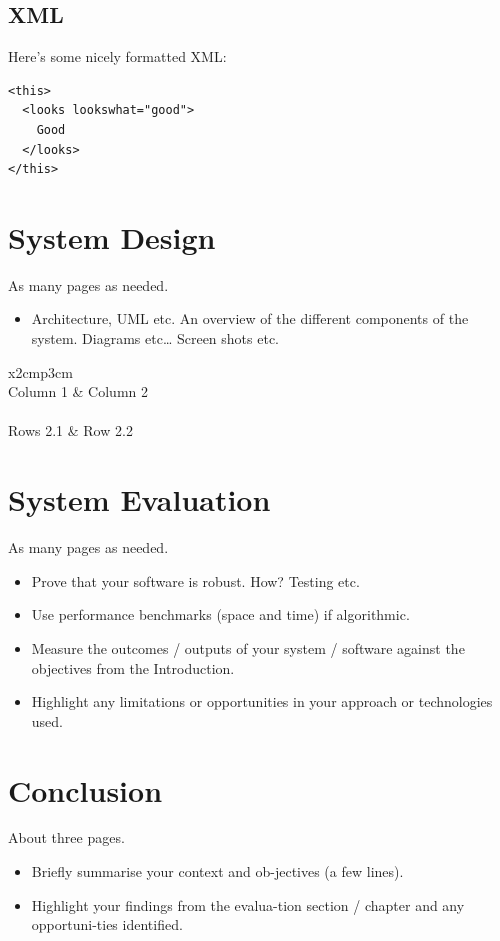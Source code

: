 \section{XML}
Here's some nicely formatted XML:
\begin{verbatim}
<this>
  <looks lookswhat="good">
    Good
  </looks>
</this>
\end{verbatim}

\chapter{System Design}
As many pages as needed.
\begin{itemize}
\item Architecture, UML etc. An overview of the different components of the system. Diagrams etc… Screen shots etc.
\end{itemize}

\begin{table}[h]
  \centering
  \begin{tabular}{x{2cm}p{3cm}}
    \toprule \\
    Column 1 & Column 2 \\
    \midrule \\
    Rows 2.1 & Row 2.2 \\
    \bottomrule
  \end{tabular}
  \caption{A table.}
  \label{table:mytable}
\end{table}

\chapter{System Evaluation}
As many pages as needed.
\begin{itemize}
\item Prove that your software is robust. How? Testing etc. 
\item Use performance benchmarks (space and time) if algorithmic.
\item Measure the outcomes / outputs of your system / software against the objectives from the Introduction.
\item Highlight any limitations or opportunities in your approach or technologies used.
\end{itemize}

\chapter{Conclusion}
About three pages.

\begin{itemize}
\item Briefly summarise your context and ob-jectives (a few lines).
\item Highlight your findings from the evalua-tion section / chapter and any opportuni-ties identified.
\end{itemize}

